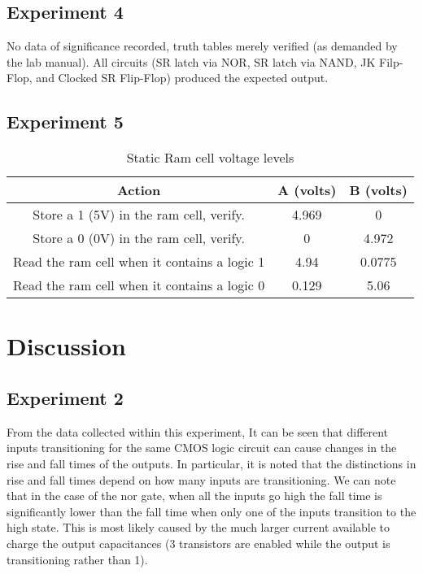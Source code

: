 \documentclass[10pt]{article}
\begin{document}
\subsection{Experiment 4}

No data of significance recorded, truth tables merely verified (as
demanded by the lab manual). All circuits (SR latch via NOR, SR latch via
NAND, JK Filp-Flop, and Clocked SR Flip-Flop) produced the expected
output.

\subsection{Experiment 5}

\begin{table}[H]
	\centering
	\begin{tabular}{ c|c|c }
	Action & A (volts) & B (volts) \\ \hline
	Store a 1 (5V) in the ram cell, verify. & 4.969 & 0 \\
	Store a 0 (0V) in the ram cell, verify. & 0     & 4.972 \\
	Read the ram cell when it contains a logic 1 & 4.94 & 0.0775 \\
	Read the ram cell when it contains a logic 0 & 0.129 & 5.06 \\
	\end{tabular}
	\label{tbl:ram}
	\caption{Static Ram cell voltage levels}
\end{table}

\section{Discussion}

\subsection{Experiment 2}

From the data collected within this experiment, It can be seen that
different inputs transitioning for the same CMOS logic circuit can cause
changes in the rise and fall times of the outputs. In particular, it is
noted that the distinctions in rise and fall times depend on how many
inputs are transitioning. We can note that in the case of the nor gate,
when all the inputs go high the fall time is significantly lower than the
fall time when only one of the inputs transition to the high state. This
is most likely caused by the much larger current available to charge the
output capacitances (3 transistors are enabled while the output is
transitioning rather than 1).
\end{document}
